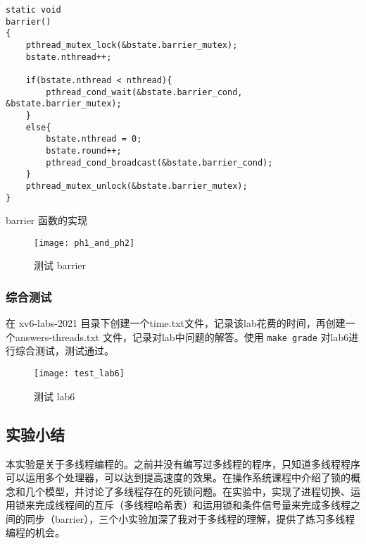 \begin{listing}[!htb]
	\begin{verbatim}
static void 
barrier()
{
    pthread_mutex_lock(&bstate.barrier_mutex);
    bstate.nthread++;
    
    if(bstate.nthread < nthread){
        pthread_cond_wait(&bstate.barrier_cond, &bstate.barrier_mutex);
    }
    else{
        bstate.nthread = 0;
        bstate.round++;
        pthread_cond_broadcast(&bstate.barrier_cond);
    }
    pthread_mutex_unlock(&bstate.barrier_mutex);
}
	\end{verbatim}
	\caption{barrier 函数的实现}\label{lst:barrier}
\end{listing}

\begin{figure}[!htb]
	\centering
	\texttt{[image: ph1\_and\_ph2]}
	\caption{测试 barrier}
	\label{fig:test_barrier}
\end{figure}

\subsubsection{综合测试}

在 xv6-labs-2021 目录下创建一个time.txt文件，记录该lab花费的时间，再创建一个answers-threads.txt 文件，记录对lab中问题的解答。使用 \texttt{make grade} 对lab6进行综合测试，测试通过。

\begin{figure}[!htb]
	\centering
	\texttt{[image: test\_lab6]}
	\caption{测试 lab6}
	\label{fig:test_lab6}
\end{figure}

\subsection{实验小结}

本实验是关于多线程编程的。之前并没有编写过多线程的程序，只知道多线程程序可以运用多个处理器，可以达到提高速度的效果。在操作系统课程中介绍了锁的概念和几个模型，并讨论了多线程存在的死锁问题。在实验中，实现了进程切换、运用锁来完成线程间的互斥（多线程哈希表）和运用锁和条件信号量来完成多线程之间的同步（barrier），三个小实验加深了我对于多线程的理解，提供了练习多线程编程的机会。 